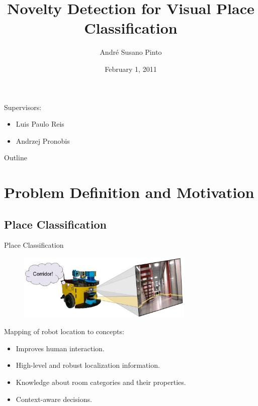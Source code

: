\documentclass[compress]{beamer}
\title{Novelty Detection for Visual Place Classification}
\author{André Susano Pinto\inst{1}}
\date{February 1, 2011}
\institute[FEUP] {
 \inst{1}Faculdade de Engenharia da Universidade do Porto
}
\begin{document}

\begin{frame}
 \titlepage

    Supervisors:
    \begin{itemize}
    \item Luis Paulo Reis
    \item Andrzej Pronobis
    \end{itemize}
\end{frame}

\begin{frame}{Outline}
 \tableofcontents
\end{frame}

\section{Problem Definition and Motivation}
\subsection{Place Classification}
\begin{frame}{Place Classification}
\begin{figure}
\includegraphics[width=0.75\textwidth]{figures/place_classification.png}
\end{figure}
Mapping of robot location to concepts:
\begin{itemize}
\item Improves human interaction.
\item High-level and robust localization information.
\item Knowledge about room categories and their properties.
\item Context-aware decisions\cite{dey2000towards}.
\end{itemize}
\end{frame}
\end{document}
